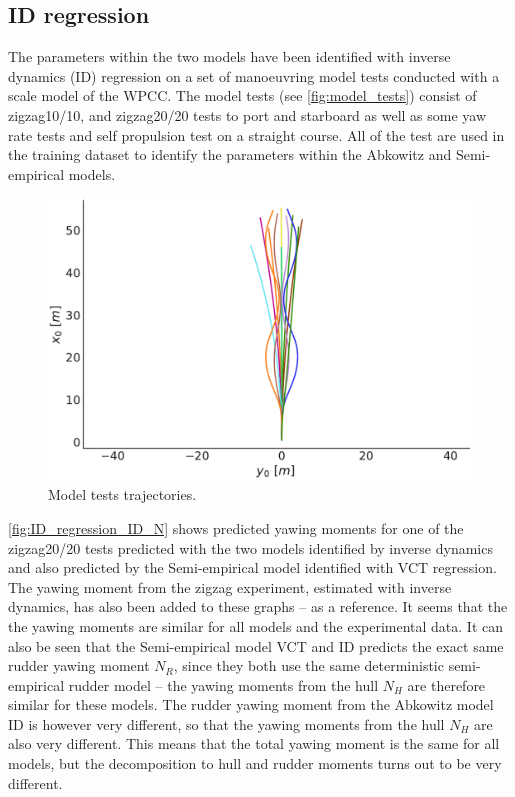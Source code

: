 \subsection{ID regression}
\label{sec:result_ID_regression}
The parameters within the two models have been identified with inverse dynamics (ID) regression on a set of manoeuvring model tests conducted with a scale model of the WPCC. The model tests (see \autoref{fig:model_tests}) consist of zigzag10/10, and zigzag20/20 tests to port and starboard as well as some yaw rate tests and self propulsion test on a straight course. All of the test are used in the training dataset to identify the parameters within the Abkowitz and Semi-empirical models.
\begin{figure}[h!]
    \includegraphics[width=\columnwidth]{figures/result_ID_regression.model_tests.pdf}
    \caption{Model tests trajectories.}
    \label{fig:model_tests}
\end{figure}
\autoref{fig:ID_regression_ID_N} shows predicted yawing moments for one of the zigzag20/20 tests predicted with the two models identified by inverse dynamics and also predicted by the Semi-empirical model identified with VCT regression. The yawing moment from the zigzag experiment, estimated with inverse dynamics, has also been added to these graphs -- as a reference. It seems that the the yawing moments are similar for all models and the experimental data. It can also be seen that the Semi-empirical model VCT and ID predicts the exact same rudder yawing moment $N_R$, since they both use the same deterministic semi-empirical rudder model -- the yawing moments from the hull $N_H$ are therefore similar for these models. The rudder yawing moment from the Abkowitz model ID is however very different, so that the yawing moments from the hull $N_H$ are also very different. This means that the total yawing moment is the same for all models, but the decomposition to hull and rudder moments turns out to be very different.
